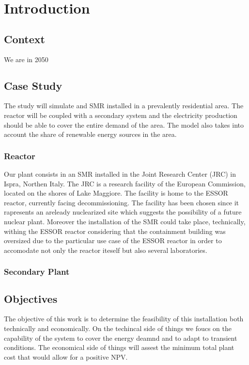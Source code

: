 \section{Introduction}
\subsection{Context}
We are in 2050

\subsection{Case Study}
The study will simulate and SMR installed in a prevalently residential area.
The reactor will be coupled with a secondary system and the electricity production should be able to cover the entire demand of the area.
The model also takes into account the share of renewable energy sources in the area.

\subsubsection{Reactor}
Our plant consists in an SMR installed in the Joint Research Center (JRC) in Ispra, Northen Italy.
The JRC is a research facility of the European Commission, located on the shores of Lake Maggiore.
The facility is home to the ESSOR reactor, currently facing decommissioning.
The facility has been chosen since it rapresents an areleady nuclearized site which suggests the possibility of a future nuclear plant.
Moreover the installation of the SMR could take place, technically, withing the ESSOR reactor considering that the containment building 
was oversized due to the particular use case of the ESSOR reactor in order to accomodate not only the reactor iteself but also several laboratories.

\subsubsection{Secondary Plant}

\subsection{Objectives}
The objective of this work is to determine the feasibility of this installation both technically and economically.
On the techincal side of things we foucs on the capability of the system to cover the energy deamnd and to adapt to transient conditions.
The economical side of things will assest the minimum total plant cost that would allow for a positive NPV.  
